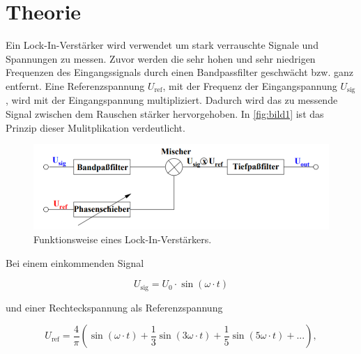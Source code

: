 \section{Theorie}
\label{sec:Theorie}




Ein Lock-In-Verstärker wird verwendet um stark verrauschte Signale und Spannungen zu messen.
Zuvor werden die sehr hohen und sehr niedrigen Frequenzen des Eingangssignals durch einen Bandpassfilter geschwächt bzw. ganz entfernt.
Eine Referenzspannung $U_\text{ref}$, mit der Frequenz der Eingangspannung $U_\text{sig}$, wird mit der Eingangspannung multipliziert.
Dadurch wird das zu messende Signal zwischen dem Rauschen stärker hervorgehoben.
In \autoref{fig:bild1} ist das Prinzip dieser Mulitplikation verdeutlicht.

\begin{figure}
    \centering
    \includegraphics[width=\textwidth/2]{images/bild1.png}
    \caption{Funktionsweise eines Lock-In-Verstärkers.\cite{V303}}
    \label{fig:bild1}
\end{figure}

Bei einem einkommenden Signal 

\begin{equation}
    U_\text{sig} = U_0 \cdot \sin{\left(\omega \cdot t\right)}
    \label{eq:u_sig}
\end{equation}

und einer Rechteckspannung als Referenzspannung

\begin{equation}
    U_\text{ref} = \frac{4}{\pi} \left(\sin{\left(\omega \cdot t\right)} + \frac{1}{3}\sin{\left(3\omega \cdot t\right)} +  \frac{1}{5}\sin{\left(5\omega \cdot t\right)} + ...\right),
    \label{eq:u_ref}
\end{equation}


